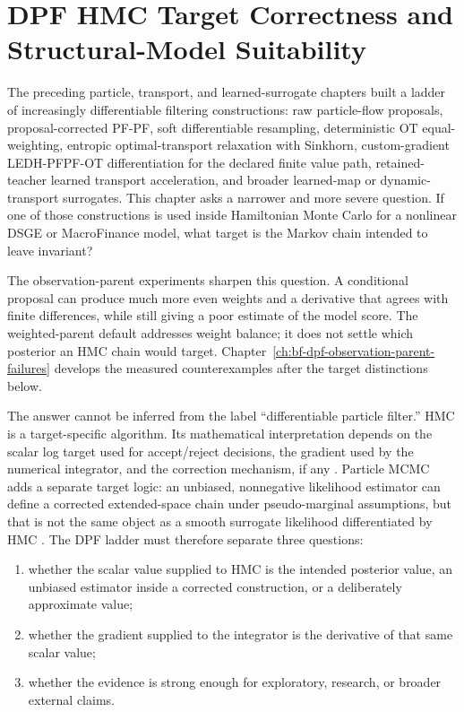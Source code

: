 \chapter{DPF HMC Target Correctness and Structural-Model Suitability}
\label{ch:bf-dpf-hmc-target-suitability}

The preceding particle, transport, and learned-surrogate chapters built a ladder
of increasingly differentiable filtering constructions: raw particle-flow
proposals, proposal-corrected PF-PF, soft differentiable resampling,
deterministic OT equal-weighting, entropic optimal-transport relaxation with
Sinkhorn, custom-gradient LEDH-PFPF-OT differentiation for the declared finite
value path, retained-teacher learned transport acceleration, and broader
learned-map or dynamic-transport surrogates.
This chapter asks a narrower and more severe
question.  If one of those constructions is used inside Hamiltonian Monte Carlo
for a nonlinear DSGE or MacroFinance model, what target is the Markov chain
intended to leave invariant?

The observation-parent experiments sharpen this question. A conditional
proposal can produce much more even weights and a derivative that agrees
with finite differences, while still giving a poor estimate of the model
score. The weighted-parent default addresses weight balance; it does not
settle which posterior an HMC chain would target. Chapter~\ref{ch:bf-dpf-observation-parent-failures}
develops the measured counterexamples after the target distinctions below.

The answer cannot be inferred from the label ``differentiable particle
filter.''  HMC is a target-specific algorithm.  Its mathematical interpretation
depends on the scalar log target used for accept/reject decisions, the gradient
used by the numerical integrator, and the correction mechanism, if any
\citep{neal2011mcmc,betancourt2017conceptual}.  Particle MCMC adds a separate
target logic: an unbiased, nonnegative likelihood estimator can define a
corrected extended-space chain under pseudo-marginal assumptions, but that is
not the same object as a smooth surrogate likelihood differentiated by HMC
\citep{andrieu2009pseudo,andrieu2010particle}.  The DPF ladder must therefore
separate three questions:
\begin{enumerate}[label=(\roman*)]
  \item whether the scalar value supplied to HMC is the intended posterior
    value, an unbiased estimator inside a corrected construction, or a
    deliberately approximate value;
  \item whether the gradient supplied to the integrator is the derivative of
    that same scalar value;
  \item whether the evidence is strong enough for exploratory, research, or
    broader external claims.
\end{enumerate}

